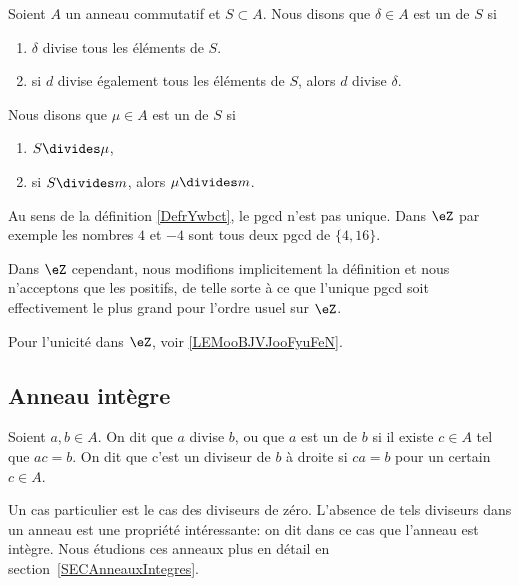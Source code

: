 \begin{definition}\label{DefrYwbct}
    Soient \( A\) un anneau commutatif et \( S\subset A\). Nous disons que \( \delta\in A\) est un  de \( S\) si
    \begin{enumerate}
        \item
            \( \delta\) divise tous les éléments de \( S\).
        \item
            si \( d\) divise également tous les éléments de \( S\), alors \( d\) divise \( \delta\).
    \end{enumerate}
    Nous disons que \( \mu\in A\) est un  de \( S\) si
    \begin{enumerate}
        \item
            \( S\divides \mu\),
        \item
            si \( S\divides m\), alors \( \mu\divides m\).
    \end{enumerate}
\end{definition}

\begin{remark}
    Au sens de la définition \ref{DefrYwbct}, le pgcd n'est pas unique. Dans \( \eZ\) par exemple les nombres \( 4\) et \( -4\) sont tous deux pgcd de \( \{4,16  \}\).

    Dans \( \eZ\) cependant, nous modifions implicitement la définition et nous n'acceptons que les positifs, de telle sorte à ce que l'unique pgcd soit effectivement le plus grand pour l'ordre usuel sur \( \eZ\).

    Pour l'unicité dans \( \eZ\), voir \ref{LEMooBJVJooFyuFeN}.
\end{remark}

\subsection{Anneau intègre}

\begin{definition}\label{DiviseursAnneau}
	Soient \( a, b \in A \). On dit que $a$ divise $b$, ou que $a$ est un  de $b$ si il existe \( c \in A \) tel que \( ac = b \). On dit que c'est un diviseur de $b$ à droite si \( ca = b \) pour un certain \( c \in A \).
\end{definition}
Un cas particulier est le cas des diviseurs de zéro. L'absence de tels diviseurs dans un anneau est une propriété intéressante: on dit dans ce cas que l'anneau est intègre. Nous étudions ces anneaux plus en détail en section~\ref{SECAnneauxIntegres}.

